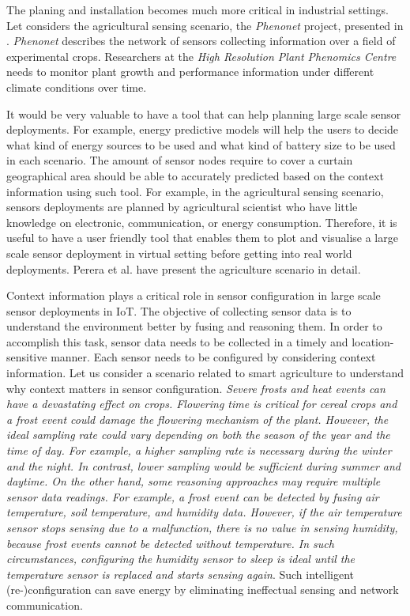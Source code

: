 \documentclass[journal]{IEEEtran}
\begin{document}
   
   The planing and installation becomes much more critical in industrial settings. Let considers the agricultural sensing scenario, the \textit{Phenonet} project, presented in \cite{ZMC008}. \textit{Phenonet} describes    the network of sensors collecting information over a    field of experimental crops. Researchers at the \textit{High    Resolution Plant Phenomics Centre} \cite{P585} needs to  monitor plant growth and    performance information under different climate conditions over time.
   
   It would be very valuable to have a tool that can help planning large scale sensor deployments. For example, energy predictive models will help the users to decide what kind of energy sources to be used and what kind of battery size to be used in each scenario. The amount of sensor nodes require to cover a curtain geographical area should be able to accurately predicted based on the context information using such tool. For example, in the agricultural sensing scenario, sensors  deployments are  planned by agricultural scientist who have little knowledge on  electronic, communication, or energy consumption. Therefore, it is useful to have a user friendly tool that enables them to plot and visualise a large scale sensor deployment in virtual setting before getting into real world deployments. Perera et al. \cite{ZMC008} have present the agriculture scenario in detail.  
    
    
    Context information plays a critical role in sensor configuration in large scale sensor deployments in IoT. The objective of collecting sensor data is to understand the environment better by fusing and reasoning  them. In order to accomplish this task, sensor data needs to be collected in a timely and location-sensitive manner. Each sensor needs to be configured by considering context information. Let us consider a scenario related to smart agriculture to understand why context matters in sensor configuration. \textit{Severe frosts and heat events can have a devastating effect on crops. Flowering time is critical for cereal crops and a frost event could damage the flowering mechanism of the plant. However, the ideal sampling rate could vary depending on both the season of the year and the time of day. For example, a higher sampling rate is necessary during the winter and the night. In contrast, lower sampling would be sufficient during summer and daytime. On the other hand, some reasoning approaches may require multiple sensor data readings. For example, a frost event can be detected by fusing air temperature, soil temperature, and humidity data. However, if the air temperature sensor stops sensing due to a malfunction, there is no value in sensing humidity, because frost events cannot be detected without temperature. In such circumstances, configuring the humidity sensor to sleep is ideal until the temperature sensor is replaced and starts sensing again}. Such intelligent (re-)configuration can save energy by eliminating  ineffectual  sensing and network communication.
    
\end{document}
